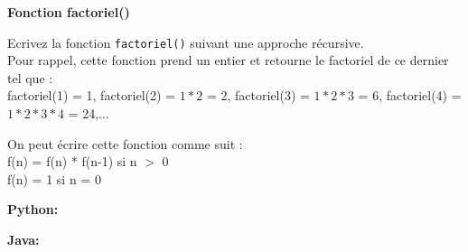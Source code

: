 \begin{Exercice}[10 minutes] \textbf{Fonction factoriel()} 
	
        Ecrivez la fonction \lstinline{factoriel()} suivant une approche récursive. \\ 
        
        Pour rappel, cette fonction prend un entier et retourne le factoriel de ce dernier tel que : \\
        
        factoriel(1) = 1, factoriel(2) = $1*2$ = 2, factoriel(3) = $1*2*3$ = 6, factoriel(4) = $1*2*3*4$ = 24,...
          
        
            \begin{conseil} 
            On peut écrire cette fonction comme suit : \\
            
            f(n) = f(n) * f(n-1) si n $>$ 0 \\
            
            f(n) = 1 si n = 0
            
            \end{conseil} 
        
            \begin{solution} 
                \textbf{Python:}
                
                \textbf{Java:}
                
            \end{solution} 
        
\end{Exercice}
    
        

